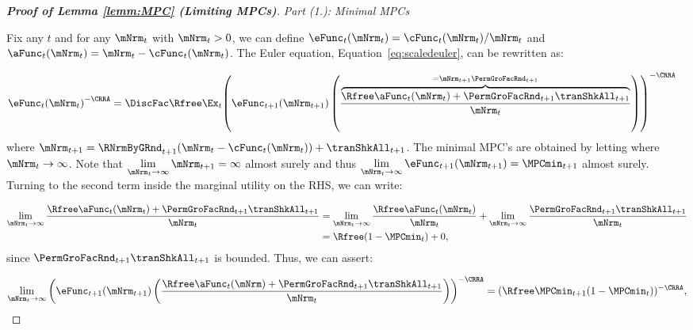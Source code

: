 \documentclass[\econtexRoot/BufferStockTheory]{subfiles}
\begin{document}
\begin{proof}[\textbf{Proof of Lemma \ref{lemm:MPC} (Limiting MPCs)}]

\vspace{0.7em} 
\noindent\textit{Part (1.): Minimal MPCs}  
\vspace{0.7em} 

Fix any $t$ and for any $\mNrm_{t}$ with  $\mNrm_{t}>0$, we can define $\eFunc_{t}(\mNrm_{t})=\cFunc_{t}(\mNrm_{t})/\mNrm_{t}$ and $\aFunc_{t}(\mNrm_{t})= \mNrm_{t} -\cFunc_{t}(\mNrm_{t})$.
The Euler equation, Equation~\eqref{eq:scaledeuler}, can be rewritten as:

\begin{equation}\begin{gathered}\begin{aligned}\label{eq:eFuncEuler}
 \eFunc_{t}{(\mNrm_{t})}^{-\CRRA}  & = \DiscFac \Rfree \Ex_{t}{\left(\eFunc_{t+1}({\mNrm}_{t+1})\left(\frac{\overbrace{\Rfree \aFunc_{t}(\mNrm_{t})+{\PermGroFacRnd}_{t+1}{\tranShkAll}_{t+1}}^{={\mNrm}_{t+1} \PermGroFacRnd_{t+1}}}{\mNrm_{t}}\right)\right)}^{-\CRRA }
\end{aligned}\end{gathered}\end{equation}
%
where ${\mNrm}_{t+1} = \RNrmByGRnd_{t+1}(\mNrm_{t} -\cFunc_{t}(\mNrm_{t})) +\tranShkAll_{t+1}$.
The minimal MPC's are obtained by letting where $\mNrm_{t} \rightarrow \infty$.
Note that $\lim\limits_{\mNrm_{t}\rightarrow \infty} \mNrm_{t+1} = \infty$ almost surely and thus $\lim\limits_{\mNrm_{t}\rightarrow \infty}\eFunc_{t+1}({\mNrm}_{t+1}) = \MPCmin_{t+1}$ almost surely.
Turning to the second term inside the marginal utility on the RHS, we can write:

\begin{align}
\lim_{\mNrm_{t}\rightarrow \infty}\frac{\Rfree \aFunc_{t}(\mNrm_{t})+{\PermGroFacRnd}_{t+1}{\tranShkAll}_{t+1}}{\mNrm_{t}} &  = \lim_{\mNrm_{t}\rightarrow \infty}\frac{\Rfree \aFunc_{t}(\mNrm_{t})}{\mNrm_{t}} + \lim_{\mNrm_{t}\rightarrow \infty}\frac{{\PermGroFacRnd}_{t+1}{\tranShkAll}_{t+1}}{\mNrm_{t}} \\
			& = \Rfree (1- \MPCmin_{t}) + 0, 
\end{align}
since ${\PermGroFacRnd}_{t+1}{\tranShkAll}_{t+1}$ is bounded.
Thus, we can assert:

\begin{equation}
\lim_{\mNrm_{t}\rightarrow \infty}{\left(\eFunc_{t+1}({\mNrm}_{t+1})\left(\frac{\Rfree \aFunc_{t}(\mNrm)+{\PermGroFacRnd}_{t+1}{\tranShkAll}_{t+1}}{\mNrm_{t}}\right)\right)}^{-\CRRA } = (\Rfree\MPCmin_{t+1}(1-\MPCmin_{t}))^{-\CRRA}, 
\end{equation}


\end{proof}
\end{document}
